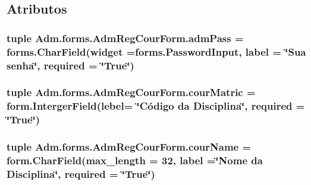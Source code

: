 \subsection{Atributos}
\hypertarget{classAdm_1_1forms_1_1AdmRegCourForm_a0b753c4784edb7d3f2bbca64f8883ae9}{
\subsubsection[{adm\-Pass}]{\setlength{\rightskip}{0pt plus 5cm}tuple Adm.\-forms.\-Adm\-Reg\-Cour\-Form.\-adm\-Pass = forms.\-Char\-Field(widget =forms.\-Password\-Input, label = \char`\"{}Sua senha\char`\"{}, required = \char`\"{}True\char`\"{})\hspace{0.3cm}{\ttfamily [static]}}}\label{classAdm_1_1forms_1_1AdmRegCourForm_a0b753c4784edb7d3f2bbca64f8883ae9}
\hypertarget{classAdm_1_1forms_1_1AdmRegCourForm_a5030e7e3ac46b325e10adc6d39ea9736}{
\subsubsection[{cour\-Matric}]{\setlength{\rightskip}{0pt plus 5cm}tuple Adm.\-forms.\-Adm\-Reg\-Cour\-Form.\-cour\-Matric = form.\-Interger\-Field(lebel= \char`\"{}Código da Disciplina\char`\"{}, required = \char`\"{}True\char`\"{})\hspace{0.3cm}{\ttfamily [static]}}}\label{classAdm_1_1forms_1_1AdmRegCourForm_a5030e7e3ac46b325e10adc6d39ea9736}
\hypertarget{classAdm_1_1forms_1_1AdmRegCourForm_afc325feb749069ea57387630cc0acc5a}{
\subsubsection[{cour\-Name}]{\setlength{\rightskip}{0pt plus 5cm}tuple Adm.\-forms.\-Adm\-Reg\-Cour\-Form.\-cour\-Name = form.\-Char\-Field(max\-\_\-length = 32, label =\char`\"{}Nome da Disciplina\char`\"{}, required = \char`\"{}True\char`\"{})\hspace{0.3cm}{\ttfamily [static]}}}\label{classAdm_1_1forms_1_1AdmRegCourForm_afc325feb749069ea57387630cc0acc5a}
